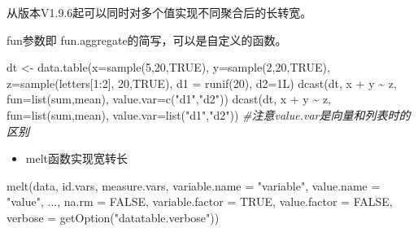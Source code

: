 \documentclass[
]{book}
\newenvironment{Shaded}{\begin{snugshade}}{\end{snugshade}}
\newcommand{\AttributeTok}[1]{\textcolor[rgb]{0.77,0.63,0.00}{#1}}
\newcommand{\CommentTok}[1]{\textcolor[rgb]{0.56,0.35,0.01}{\textit{#1}}}
\newcommand{\ConstantTok}[1]{\textcolor[rgb]{0.00,0.00,0.00}{#1}}
\newcommand{\DecValTok}[1]{\textcolor[rgb]{0.00,0.00,0.81}{#1}}
\newcommand{\FunctionTok}[1]{\textcolor[rgb]{0.00,0.00,0.00}{#1}}
\newcommand{\NormalTok}[1]{#1}
\newcommand{\OtherTok}[1]{\textcolor[rgb]{0.56,0.35,0.01}{#1}}
\newcommand{\SpecialCharTok}[1]{\textcolor[rgb]{0.00,0.00,0.00}{#1}}
\newcommand{\StringTok}[1]{\textcolor[rgb]{0.31,0.60,0.02}{#1}}
\providecommand{\tightlist}{%
  \setlength{\itemsep}{0pt}\setlength{\parskip}{0pt}}
\begin{document}
从版本V1.9.6起可以同时对多个值实现不同聚合后的长转宽。

fun参数即 fun.aggregate的简写，可以是自定义的函数。

\begin{Shaded}
\begin{Highlighting}[]
\NormalTok{dt }\OtherTok{\textless{}{-}}  \FunctionTok{data.table}\NormalTok{(}\AttributeTok{x=}\FunctionTok{sample}\NormalTok{(}\DecValTok{5}\NormalTok{,}\DecValTok{20}\NormalTok{,}\ConstantTok{TRUE}\NormalTok{), }\AttributeTok{y=}\FunctionTok{sample}\NormalTok{(}\DecValTok{2}\NormalTok{,}\DecValTok{20}\NormalTok{,}\ConstantTok{TRUE}\NormalTok{),}
                \AttributeTok{z=}\FunctionTok{sample}\NormalTok{(letters[}\DecValTok{1}\SpecialCharTok{:}\DecValTok{2}\NormalTok{], }\DecValTok{20}\NormalTok{,}\ConstantTok{TRUE}\NormalTok{), }\AttributeTok{d1 =} \FunctionTok{runif}\NormalTok{(}\DecValTok{20}\NormalTok{), }\AttributeTok{d2=}\NormalTok{1L)}
\FunctionTok{dcast}\NormalTok{(dt, x }\SpecialCharTok{+}\NormalTok{ y }\SpecialCharTok{\textasciitilde{}}\NormalTok{ z, }\AttributeTok{fun=}\FunctionTok{list}\NormalTok{(sum,mean), }\AttributeTok{value.var=}\FunctionTok{c}\NormalTok{(}\StringTok{"d1"}\NormalTok{,}\StringTok{"d2"}\NormalTok{))}
\FunctionTok{dcast}\NormalTok{(dt, x }\SpecialCharTok{+}\NormalTok{ y }\SpecialCharTok{\textasciitilde{}}\NormalTok{ z, }\AttributeTok{fun=}\FunctionTok{list}\NormalTok{(sum,mean), }\AttributeTok{value.var=}\FunctionTok{list}\NormalTok{(}\StringTok{"d1"}\NormalTok{,}\StringTok{"d2"}\NormalTok{)) }\CommentTok{\#注意value.var是向量和列表时的区别}
\end{Highlighting}
\end{Shaded}

\begin{itemize}
\tightlist
\item
  melt函数实现宽转长
\end{itemize}

\begin{Shaded}
\begin{Highlighting}[]
\FunctionTok{melt}\NormalTok{(data, id.vars, measure.vars,}
    \AttributeTok{variable.name =} \StringTok{"variable"}\NormalTok{, }\AttributeTok{value.name =} \StringTok{"value"}\NormalTok{,}
\NormalTok{    ..., }\AttributeTok{na.rm =} \ConstantTok{FALSE}\NormalTok{, }\AttributeTok{variable.factor =} \ConstantTok{TRUE}\NormalTok{,}
    \AttributeTok{value.factor =} \ConstantTok{FALSE}\NormalTok{,}
    \AttributeTok{verbose =} \FunctionTok{getOption}\NormalTok{(}\StringTok{"datatable.verbose"}\NormalTok{))}
\end{Highlighting}
\end{Shaded}
\end{document}
